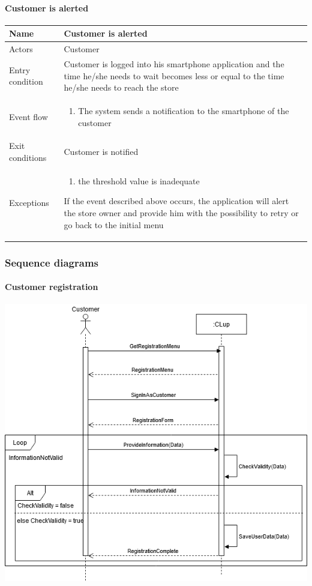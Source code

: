 \paragraph{Customer is alerted}
\begin{flushleft}
	\begin{tabular} { | m{3cm} | m{10cm} | }
		\hline
		Name & Customer is alerted\\
		\hline
		Actors & Customer\\
		\hline
		Entry condition & Customer is logged into his smartphone application and the time he/she needs to wait becomes less or equal to the time he/she needs to reach the store\\
		\hline
		Event flow & \begin{enumerate}
			\item The system sends a notification to the smartphone of the customer
		\end{enumerate}\\
		\hline
		Exit conditions & Customer is notified\\
		\hline
		Exceptions & \begin{enumerate}
			\item the threshold value is inadequate
		\end{enumerate}
		If the event described above occurs, the application will alert the store owner and provide him with the possibility to retry or go back to the initial menu\\
		\hline
	\end{tabular}
\end{flushleft}
\newpage
\subsubsection{Sequence diagrams}
\paragraph{Customer registration}
\begin{flushleft}
	\includegraphics[scale=0.5]{Images/UseCase1Diagram.png}
\end{flushleft}
